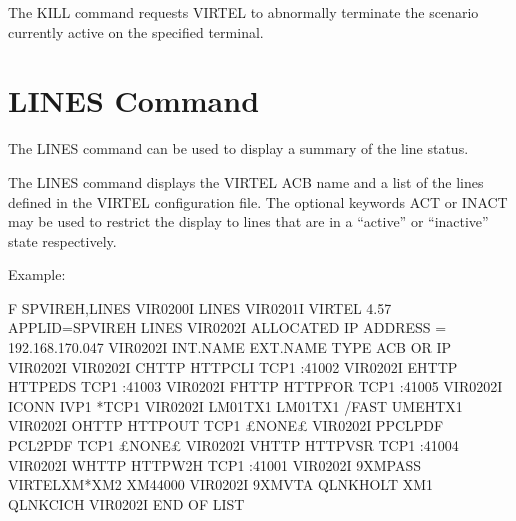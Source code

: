 \documentclass[letterpaper,10pt,english]{sphinxmanual}
\begin{document}
The KILL command requests VIRTEL to abnormally terminate the scenario currently active on the specified terminal.


\section{LINES Command}
\label{\detokenize{audit_operations_ and_performance:index-4}}\label{\detokenize{audit_operations_ and_performance:lines-command}}
The LINES command can be used to display a summary of the line status.

\begin{sphinxVerbatim}[commandchars=\\\{\}]
    
\end{sphinxVerbatim}

The LINES command displays the VIRTEL ACB name and a list of the lines defined in the VIRTEL configuration file. The optional keywords ACT or INACT may be used to restrict the display to lines that are in a “active” or “inactive” state respectively.

Example:

\begin{sphinxVerbatim}[commandchars=\\\{\}]
F SPVIREH,LINES
VIR0200I LINES
VIR0201I VIRTEL 4.57 APPLID=SPVIREH  LINES
VIR0202I ALLOCATED IP ADDRESS = 192.168.170.047
VIR0202I INT.NAME EXT.NAME TYPE  ACB OR IP
VIR0202I \PYGZhy{}\PYGZhy{}\PYGZhy{}\PYGZhy{}\PYGZhy{}\PYGZhy{}\PYGZhy{}\PYGZhy{} \PYGZhy{}\PYGZhy{}\PYGZhy{}\PYGZhy{}\PYGZhy{}\PYGZhy{}\PYGZhy{}\PYGZhy{} \PYGZhy{}\PYGZhy{}\PYGZhy{}\PYGZhy{}\PYGZhy{} \PYGZhy{}\PYGZhy{}\PYGZhy{}\PYGZhy{}\PYGZhy{}\PYGZhy{}\PYGZhy{}\PYGZhy{}\PYGZhy{}
VIR0202I C\PYGZhy{}HTTP   HTTP\PYGZhy{}CLI TCP1  :41002
VIR0202I E\PYGZhy{}HTTP   HTTP\PYGZhy{}EDS TCP1  :41003
VIR0202I F\PYGZhy{}HTTP   HTTP\PYGZhy{}FOR TCP1  :41005
VIR0202I I\PYGZhy{}CONN   IVP1    *TCP1
VIR0202I LM01TX1  LM01TX1  /FAST UMEHTX1
VIR0202I O\PYGZhy{}HTTP   HTTP\PYGZhy{}OUT TCP1  £NONE£
VIR0202I P\PYGZhy{}PCLPDF PCL2PDF  TCP1  £NONE£
VIR0202I V\PYGZhy{}HTTP   HTTP\PYGZhy{}VSR TCP1  :41004
VIR0202I W\PYGZhy{}HTTP   HTTP\PYGZhy{}W2H TCP1  :41001
VIR0202I 9\PYGZhy{}XMPASS VIRTELXM*XM2   XM44000
VIR0202I 9\PYGZhy{}XMVTA  QLNKHOLT XM1   QLNKCICH
VIR0202I \PYGZhy{}\PYGZhy{}\PYGZhy{}END OF LIST\PYGZhy{}\PYGZhy{}\PYGZhy{}
\end{sphinxVerbatim}
\end{document}
